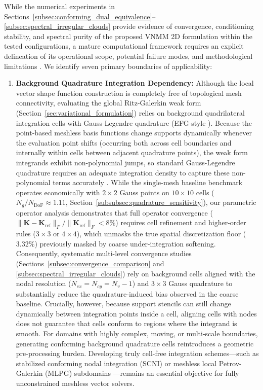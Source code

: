 \documentclass[preprint,12pt]{elsarticle}
\begin{document}
While the numerical experiments in Sections~\ref{subsec:conforming_dual_equivalence}--\ref{subsec:spectral_irregular_clouds} provide evidence of convergence, conditioning stability, and spectral purity of the proposed VNMM 2D formulation within the tested configurations, a mature computational framework requires an explicit delineation of its operational scope, potential failure modes, and methodological limitations \cite{slak2018refined}. We identify seven primary boundaries of applicability:

\begin{enumerate}
    \item \textbf{Background Quadrature Integration Dependency:} 
    Although the local vector shape function construction is completely free of topological mesh connectivity, evaluating the global Ritz-Galerkin weak form (Section~\ref{sec:variational_formulation}) relies on background quadrilateral integration cells with Gauss-Legendre quadrature (EFG-style \cite{belytschko1994element, dolbow1999numerical}). Because the point-based meshless basis functions change supports dynamically whenever the evaluation point shifts (occurring both across cell boundaries and internally within cells between adjacent quadrature points), the weak form integrands exhibit non-polynomial jumps, so standard Gauss-Legendre quadrature requires an adequate integration density to capture these non-polynomial terms accurately \cite{dolbow1999numerical}. While the single-mesh baseline benchmark operates economically with $2 \times 2$ Gauss points on $10 \times 10$ cells ($N_g / N_{\mathrm{DoF}} \approx 1.11$, Section~\ref{subsubsec:quadrature_sensitivity}), our parametric operator analysis demonstrates that full operator convergence ($\|\mathbf{K} - \mathbf{K}_{\mathrm{ref}}\|_F / \|\mathbf{K}_{\mathrm{ref}}\|_F < 8\%$) requires cell refinement and higher-order rules ($3 \times 3$ or $4 \times 4$), which unmasks the true spatial discretization floor ($3.32\%$) previously masked by coarse under-integration softening. Consequently, systematic multi-level convergence studies (Sections~\ref{subsec:convergence_comparison} and \ref{subsec:spectral_irregular_clouds}) rely on background cells aligned with the nodal resolution ($N_{cx} = N_{cy} = N_v - 1$) and $3 \times 3$ Gauss quadrature to substantially reduce the quadrature-induced bias observed in the coarse baseline. Crucially, however, because support stencils can still change dynamically between integration points inside a cell, aligning cells with nodes does not guarantee that cells conform to regions where the integrand is smooth. For domains with highly complex, moving, or multi-scale boundaries, generating conforming background quadrature cells reintroduces a geometric pre-processing burden. Developing truly cell-free integration schemes---such as stabilized conforming nodal integration (SCNI) \cite{chen2001stabilized} or meshless local Petrov-Galerkin (MLPG) subdomains \cite{atluri2002meshless}---remains an essential objective for fully unconstrained meshless vector solvers.


\end{enumerate}
\end{document}
